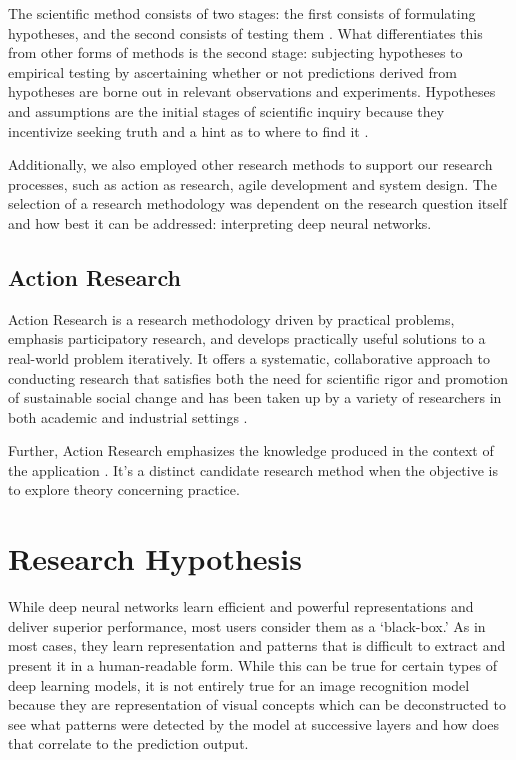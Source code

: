 The scientific method consists of two stages: the first consists of formulating hypotheses, and the second consists of testing them \cite{2016397}. What differentiates this from other forms of methods is the second stage: subjecting hypotheses to empirical testing by ascertaining whether or not predictions derived from hypotheses are borne out in relevant observations and experiments. Hypotheses and assumptions are the initial stages of scientific inquiry because they incentivize seeking truth and a hint as to where to find it \cite{AYALA2016xi}.

Additionally, we also employed other research methods to support our research processes, such as action as research, agile development and system design. The selection of a research methodology was dependent on the research question itself and how best it can be addressed: interpreting deep neural networks.

\subsection{Action Research}
Action Research is a research methodology driven by practical problems, emphasis participatory research, and develops practically useful solutions to a real-world problem iteratively. It offers a systematic, collaborative approach to conducting research that satisfies both the need for scientific rigor and promotion of sustainable social change and has been taken up by a variety of researchers in both academic and industrial settings \cite{Hayes:2011:RAR:1993060.1993065}.

Further, Action Research emphasizes the knowledge produced in the context of the application \cite{401014119781201}. It’s a distinct candidate research method when the objective is to explore theory concerning practice.

\section{Research Hypothesis}

While deep neural networks learn efficient and powerful representations and deliver superior performance, most users consider them as a ‘black-box.’ As in most cases, they learn representation and patterns that is difficult to extract and present it in a human-readable form. While this can be true for certain types of deep learning models, it is not entirely true for an image recognition model because they are representation of visual concepts which can be deconstructed to see what patterns were detected by the model at successive layers and how does that correlate to the prediction output.

